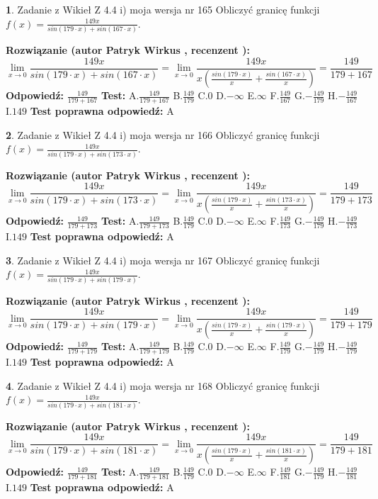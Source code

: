 \documentclass[12pt, a4paper]{article}
\theoremstyle{definition} %
\newtheorem{zad}{}
\newcommand{\zadStart}[1]{\begin{zad}#1\newline}
\newcommand{\zadStop}{\end{zad}}
\newcommand{\rozwStart}[2]{\noindent \textbf{Rozwiązanie (autor #1 , recenzent #2): }\newline}
\newcommand{\rozwStop}{\newline}
\newcommand{\odpStart}{\noindent \textbf{Odpowiedź:}\newline}
\newcommand{\odpStop}{\newline}
\newcommand{\testStart}{\noindent \textbf{Test:}\newline}
\newcommand{\testStop}{\newline}
\newcommand{\kluczStart}{\noindent \textbf{Test poprawna odpowiedź:}\newline}
\newcommand{\kluczStop}{\newline}
\begin{document}
\zadStart{Zadanie z Wikieł Z 4.4 i) moja wersja nr 165}
Obliczyć granicę funkcji $f(x)=\frac{149x}{sin(179\cdot x) +sin(167\cdot x)}$.
\zadStop
\rozwStart{Patryk Wirkus}{}
$$\lim\limits_{x\to 0}\frac{149x}{sin(179\cdot x) +sin(167\cdot x)}=\lim\limits_{x\to 0}\frac{149x}{x(\frac{sin(179\cdot x)}{x}+\frac{sin(167\cdot x)}{x})}=\frac{149}{179+167}$$
\rozwStop
\odpStart
$\frac{149}{179+167}$
\odpStop
\testStart
A.$\frac{149}{179+167}$
B.$\frac{149}{179}$
C.$0$
D.$-\infty$
E.$\infty$
F.$\frac{149}{167}$
G.$-\frac{149}{179}$
H.$-\frac{149}{167}$
I.$149$
\testStop
\kluczStart
A
\kluczStop



\zadStart{Zadanie z Wikieł Z 4.4 i) moja wersja nr 166}
Obliczyć granicę funkcji $f(x)=\frac{149x}{sin(179\cdot x) +sin(173\cdot x)}$.
\zadStop
\rozwStart{Patryk Wirkus}{}
$$\lim\limits_{x\to 0}\frac{149x}{sin(179\cdot x) +sin(173\cdot x)}=\lim\limits_{x\to 0}\frac{149x}{x(\frac{sin(179\cdot x)}{x}+\frac{sin(173\cdot x)}{x})}=\frac{149}{179+173}$$
\rozwStop
\odpStart
$\frac{149}{179+173}$
\odpStop
\testStart
A.$\frac{149}{179+173}$
B.$\frac{149}{179}$
C.$0$
D.$-\infty$
E.$\infty$
F.$\frac{149}{173}$
G.$-\frac{149}{179}$
H.$-\frac{149}{173}$
I.$149$
\testStop
\kluczStart
A
\kluczStop



\zadStart{Zadanie z Wikieł Z 4.4 i) moja wersja nr 167}
Obliczyć granicę funkcji $f(x)=\frac{149x}{sin(179\cdot x) +sin(179\cdot x)}$.
\zadStop
\rozwStart{Patryk Wirkus}{}
$$\lim\limits_{x\to 0}\frac{149x}{sin(179\cdot x) +sin(179\cdot x)}=\lim\limits_{x\to 0}\frac{149x}{x(\frac{sin(179\cdot x)}{x}+\frac{sin(179\cdot x)}{x})}=\frac{149}{179+179}$$
\rozwStop
\odpStart
$\frac{149}{179+179}$
\odpStop
\testStart
A.$\frac{149}{179+179}$
B.$\frac{149}{179}$
C.$0$
D.$-\infty$
E.$\infty$
F.$\frac{149}{179}$
G.$-\frac{149}{179}$
H.$-\frac{149}{179}$
I.$149$
\testStop
\kluczStart
A
\kluczStop



\zadStart{Zadanie z Wikieł Z 4.4 i) moja wersja nr 168}
Obliczyć granicę funkcji $f(x)=\frac{149x}{sin(179\cdot x) +sin(181\cdot x)}$.
\zadStop
\rozwStart{Patryk Wirkus}{}
$$\lim\limits_{x\to 0}\frac{149x}{sin(179\cdot x) +sin(181\cdot x)}=\lim\limits_{x\to 0}\frac{149x}{x(\frac{sin(179\cdot x)}{x}+\frac{sin(181\cdot x)}{x})}=\frac{149}{179+181}$$
\rozwStop
\odpStart
$\frac{149}{179+181}$
\odpStop
\testStart
A.$\frac{149}{179+181}$
B.$\frac{149}{179}$
C.$0$
D.$-\infty$
E.$\infty$
F.$\frac{149}{181}$
G.$-\frac{149}{179}$
H.$-\frac{149}{181}$
I.$149$
\testStop
\kluczStart
A
\kluczStop
\end{document}
